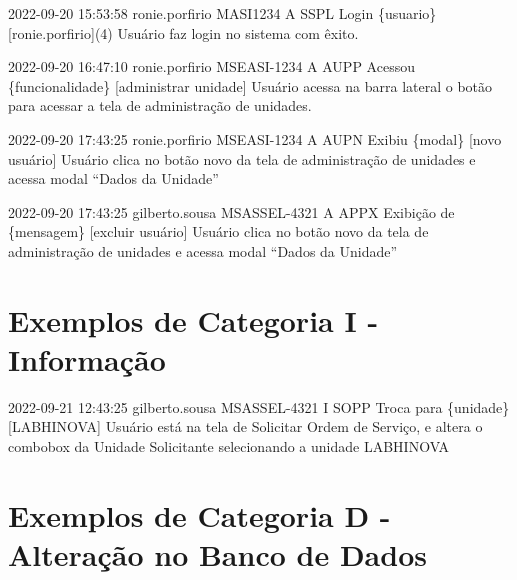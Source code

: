 {2022-09-20 15:53:58}
{ronie.porfirio}
{MASI1234}
{A}
{SSPL}
{Login \{usuario\}[ronie.porfirio](4)}
{Usuário faz login no sistema com êxito.}

{2022-09-20 16:47:10}
{ronie.porfirio}
{MSEASI-1234}
{A}
{AUPP}
{Acessou \{funcionalidade\} [administrar unidade]}
{Usuário acessa na barra lateral o botão para acessar a tela de administração de unidades.}

{2022-09-20 17:43:25}
{ronie.porfirio}
{MSEASI-1234}
{A}
{AUPN}
{Exibiu \{modal\} [novo usuário]}
{Usuário clica no botão novo da tela de administração de unidades e acessa modal ``Dados da Unidade''}

{2022-09-20 17:43:25}
{gilberto.sousa}
{MSASSEL-4321}
{A}
{APPX}
{Exibição de \{mensagem\} [excluir usuário]}
{Usuário clica no botão novo da tela de administração de unidades e acessa modal ``Dados da Unidade''}

\section{Exemplos de Categoria I - Informação}

{2022-09-21 12:43:25}
{gilberto.sousa}
{MSASSEL-4321}
{I}
{SOPP}
{Troca para \{unidade\}[LABHINOVA]}
{Usuário está na tela de Solicitar Ordem de Serviço, e altera o combobox da Unidade Solicitante selecionando a unidade LABHINOVA}


\section{Exemplos de Categoria D - Alteração no Banco de Dados}

